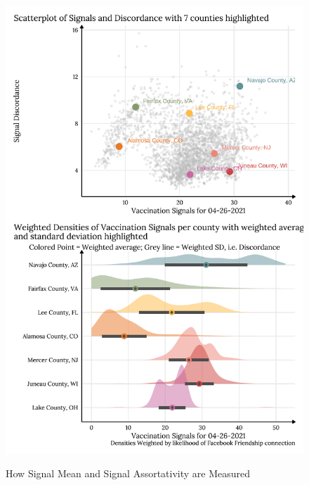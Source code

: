 \begin{figure}
{\centering \includegraphics[width=0.7\linewidth]{figs/paper3/assortativity-vacc-1}}
\caption{How Signal Mean and Signal Assortativity are Measured}\label{fig:assortativity-vacc}
\end{figure}

